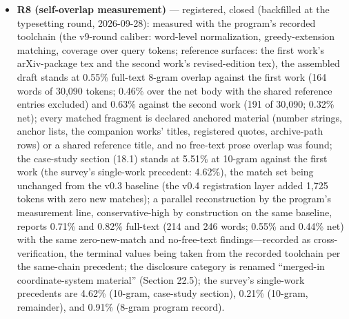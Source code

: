 \documentclass[11pt]{article}
\begin{document}
\begin{itemize}[leftmargin=1.6em,itemsep=2pt,parsep=0pt,topsep=3pt]
\item \textbf{R8 (self-overlap measurement)} — registered, closed (backfilled at the typesetting round, 2026-09-28): measured with the program's recorded toolchain (the v9-round caliber: word-level normalization, greedy-extension matching, coverage over query tokens; reference surfaces: the first work's arXiv-package tex and the second work's revised-edition tex), the assembled draft stands at 0.55\% full-text 8-gram overlap against the first work (164 words of 30,090 tokens; 0.46\% over the net body with the shared reference entries excluded) and 0.63\% against the second work (191 of 30,090; 0.32\% net); every matched fragment is declared anchored material (number strings, anchor lists, the companion works' titles, registered quotes, archive-path rows) or a shared reference title, and no free-text prose overlap was found; the case-study section (18.1) stands at 5.51\% at 10-gram against the first work (the survey's single-work precedent: 4.62\%), the match set being unchanged from the v0.3 baseline (the v0.4 registration layer added 1,725 tokens with zero new matches); a parallel reconstruction by the program's measurement line, conservative-high by construction on the same baseline, reports 0.71\% and 0.82\% full-text (214 and 246 words; 0.55\% and 0.44\% net) with the same zero-new-match and no-free-text findings—recorded as cross-verification, the terminal values being taken from the recorded toolchain per the same-chain precedent; the disclosure category is renamed ``merged-in coordinate-system material'' (Section 22.5); the survey's single-work precedents are 4.62\% (10-gram, case-study section), 0.21\% (10-gram, remainder), and 0.91\% (8-gram program record).
\end{itemize}
\end{document}
